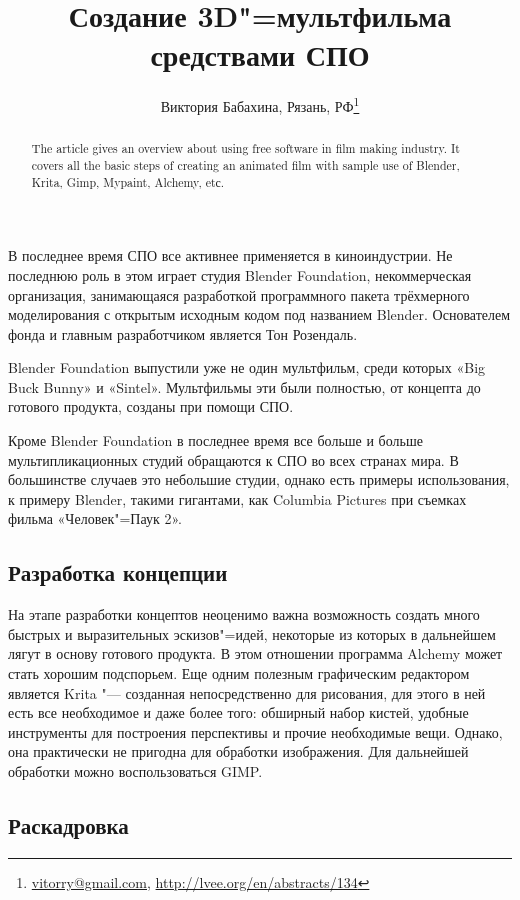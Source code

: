 \documentclass[10pt, a5paper]{article}
\begin{document}
\title{Создание 3D"=мультфильма средствами СПО}
\author{Виктория Бабахина, Рязань, РФ\footnote{\url{vitorry@gmail.com}, \url{http://lvee.org/en/abstracts/134}}}
\maketitle
\begin{abstract}
The article gives an overview about using free software in film making industry. It covers all the basic steps of creating an animated film with sample use of Blender, Krita, Gimp, Mypaint, Alchemy, etс.
\end{abstract}
В последнее время СПО все активнее применяется в киноиндустрии. Не последнюю роль в этом играет студия Blender Foundation, некоммерческая организация, занимающаяся разработкой програм\-много пакета трёхмерного моделирования с открытым исходным кодом под названием Blender. Основателем фонда и главным разработчиком является Тон Розендаль.

Blender Foundation выпустили уже не один мультфильм, среди которых «Big Buck Bunny» и «Sintel». Мультфильмы эти были полностью, от концепта до готового продукта, созданы при помощи СПО.

Кроме  Blender Foundation в последнее время все больше и больше мультипликационных студий обращаются к СПО во всех странах мира. В большинстве случаев это небольшие студии, однако есть примеры использования, к примеру Blender, такими гигантами, как Columbia Pictures при съемках фильма «Человек"=Паук 2».

\subsection*{Разработка концепции}

На этапе разработки концептов неоценимо важна возможность создать много быстрых и выразительных эскизов"=идей, некоторые из которых в дальнейшем лягут в основу готового продукта. В этом отношении  программа  Alchemy может стать хорошим подспорьем. Еще одним полезным графическим редактором является Krita "--- созданная непосредственно для рисования, для этого в ней есть все необходимое и даже более того: обширный набор кистей, удобные инструменты для построения перспективы и прочие необходимые вещи. Однако, она практически не пригодна для обработки изображения. Для дальнейшей обработки можно воспользоваться GIMP.

\subsection*{Раскадровка}
\end{document}
